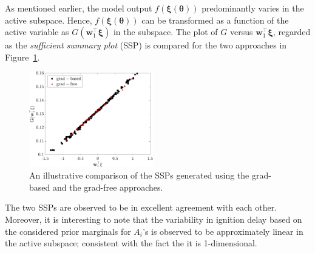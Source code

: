 As mentioned earlier, the model output $f(\bm{\xi}(\bm{\theta}))$ predominantly varies in the active subspace. Hence, 
$f(\bm{\xi}(\bm{\theta}))$ can be transformed as a function of the active variable as $G(\bm{w}_1^\top\bm{\xi})$ in
the subspace. The plot of $G$ versus $\bm{w}_1^\top\bm{\xi}$, regarded as the \textit{sufficient summary plot} (SSP) is 
compared for the two approaches in Figure~\ref{fig:comp_ssp}.
%
\begin{figure}[htbp]
 \begin{center}
  \includegraphics[width=0.48\textwidth]{./Figures/comp_ssp}
\caption{An illustrative comparison of the SSPs generated using the grad-based and the grad-free approaches.}
\label{fig:comp_ssp}
\end{center}
\end{figure}
%
The two SSPs are observed to be in excellent agreement with each other. Moreover, it is interesting to note
that the variability in ignition
delay based on the considered prior marginals for $A_i$'s is observed to be approximately linear in the
active subspace; consistent with the fact the it is 1-dimensional.

